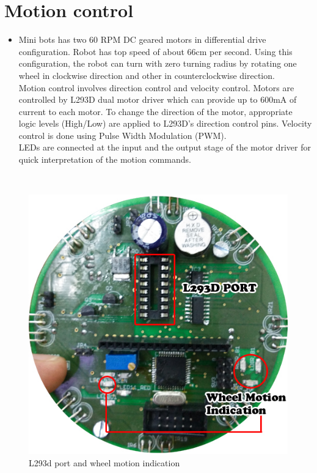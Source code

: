 \documentclass[a4paper,12pt,oneside]{book}
\begin{document}
	\chapter{Motion control}
	\begin{itemize}
	\item {Mini bots has two 60 RPM DC geared motors in differential drive configuration. Robot has top speed of about 66cm per second. Using this
		configuration, the robot can turn with zero turning radius by rotating one wheel in clockwise
		direction and other in counterclockwise direction.\\
		Motion control involves direction control and velocity control. Motors are controlled by L293D
		dual motor driver which can provide up to 600mA of current to each motor. To change the
		direction of the motor, appropriate logic levels (High/Low) are applied to L293D’s direction
		control pins. Velocity control is done using Pulse Width Modulation (PWM).\\
		LEDs are connected at the input and the output stage of the motor driver for quick interpretation
		of the motion commands.}
	\end{itemize}
	\hfill\\
	\begin{figure}[h!]
		\caption{L293d port and wheel motion indication}
		\includegraphics[width=\textwidth]{./HardwareManual/WheelMotionIndication_L293D.jpg}
	\end{figure}
	\hfill\\
		
\end{document}
